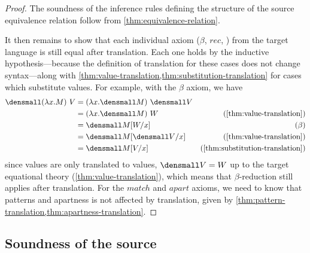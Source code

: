\thmconservativeextension*
\begin{proof}
  The soundness of the inference rules defining the structure of the source equivalence relation follow from \cref{thm:equivalence-relation}.
  
  It then remains to show that each individual axiom ($\beta$, $rec$, \etc) from the target language is still equal after translation.  Each one holds by the inductive hypothesis---because the definition of translation for these cases does not change syntax---along with \cref{thm:value-translation,thm:substitution-translation} for cases which substitute values.
  For example, with the $\beta$ axiom, we have
  \begin{align*}
    \den{(\lambda x. M) ~ V}
    &=
    (\lambda x. \den{M}) ~ \den{V}
    \\
    &=
    (\lambda x. \den{M}) ~ W
    &(\cref{thm:value-translation})
    \\
    &=
    \den{M}\subst{x}{W}
    &(\beta)
    \\
    &=
    \den{M}\subst{x}{\den{V}}
    &(\cref{thm:value-translation})
    \\
    &=
    \den{M\subst{x}{V}}
    &(\cref{thm:substitution-translation})
  \end{align*}
  since values are only translated to values, $\den{V} = W$ up to the target equational theory (\cref{thm:value-translation}), which means that $\beta$-reduction still applies after translation.
  For the $\mathit{match}$ and $\mathit{apart}$ axioms, we need to know that patterns and apartness is not affected by translation, given by \cref{thm:pattern-translation,thm:apartness-translation}.
\end{proof}

\subsection{Soundness of the source}

